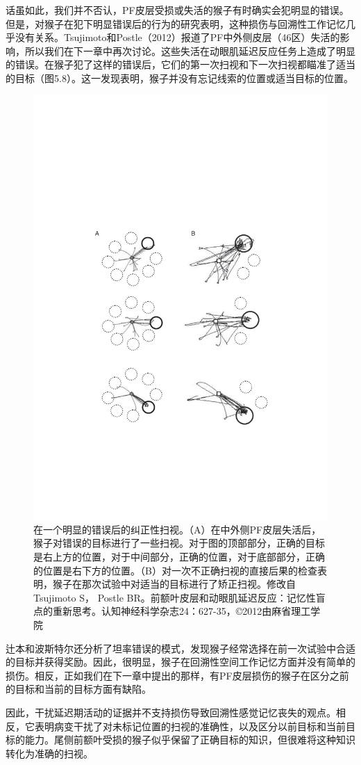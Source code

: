 话虽如此，我们并不否认，PF皮层受损或失活的猴子有时确实会犯明显的错误。但是，对猴子在犯下明显错误后的行为的研究表明，这种损伤与回溯性工作记忆几乎没有关系。Tsujimoto和Postle（2012）报道了PF中外侧皮层（46区）失活的影响，所以我们在下一章中再次讨论。这些失活在动眼肌延迟反应任务上造成了明显的错误。在猴子犯了这样的错误后，它们的第一次扫视和下一次扫视都瞄准了适当的目标（图5.8）。这一发现表明，猴子并没有忘记线索的位置或适当目标的位置。
\begin{figure}
	\centering
	\includegraphics[width=0.7\linewidth]{image_pfc/Fig_5_8}
	\caption{在一个明显的错误后的纠正性扫视。（A）在中外侧PF皮层失活后，猴子对错误的目标进行了一些扫视。对于图的顶部部分，正确的目标是右上方的位置，对于中间部分，正确的位置，对于底部部分，正确的位置是右下方的位置。（B）对一次不正确扫视的直接后果的检查表明，猴子在那次试验中对适当的目标进行了矫正扫视。修改自Tsujimoto S， Postle BR。前额叶皮层和动眼肌延迟反应：记忆性盲点的重新思考。认知神经科学杂志24：627-35，©2012由麻省理工学院}
	\label{fig:fig}
\end{figure}
辻本和波斯特尔还分析了坦率错误的模式，发现猴子经常选择在前一次试验中合适的目标并获得奖励。因此，很明显，猴子在回溯性空间工作记忆方面并没有简单的损伤。相反，正如我们在下一章中提出的那样，有PF皮层损伤的猴子在区分之前的目标和当前的目标方面有缺陷。

因此，干扰延迟期活动的证据并不支持损伤导致回溯性感觉记忆丧失的观点。相反，它表明病变干扰了对未标记位置的扫视的准确性，以及区分以前目标和当前目标的能力。尾侧前额叶受损的猴子似乎保留了正确目标的知识，但很难将这种知识转化为准确的扫视。
